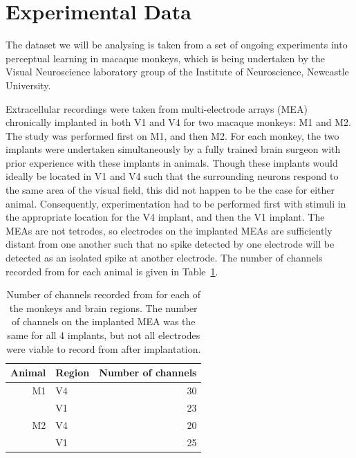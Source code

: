 \section{Experimental Data}
\label{ch:exp}

The dataset we will be analysing is taken from a set of ongoing experiments into perceptual learning in macaque monkeys, which is being undertaken by the Visual Neuroscience laboratory group of the Institute of Neuroscience, Newcastle University.

Extracellular recordings were taken from multi-electrode arrays (MEA) chronically implanted in both V1 and V4 for two macaque monkeys: M1 and M2. The study was performed first on M1, and then M2. For each monkey, the two implants were undertaken simultaneously by a fully trained brain surgeon with prior experience with these implants in animals. Though these implants would ideally be located in V1 and V4 such that the surrounding neurons respond to the same area of the visual field, this did not happen to be the case for either animal. Consequently, experimentation had to be performed first with stimuli in the appropriate location for the V4 implant, and then the V1 implant.
The MEAs are not tetrodes, so electrodes on the implanted MEAs are sufficiently distant from one another such that no spike detected by one electrode will be detected as an isolated spike at another electrode. The number of channels recorded from for each animal is given in Table~\ref{tab:nchannels}.

\begin{table}[hbtp]
\caption{\small{}Number of channels recorded from for each of the monkeys and brain regions. The number of channels on the implanted MEA was the same for all 4 implants, but not all electrodes were viable to record from after implantation.}
\label{tab:nchannels}
\begin{center}
\begin{tabular}{rlr}
\toprule
Animal  & Region & Number of channels
\\
\midrule
M1  & V4    & 30
\\
        & V1    & 23
\\
M2    & V4    & 20
\\
        & V1    & 25
\\
\bottomrule
\end{tabular}
\end{center}
\end{table}

